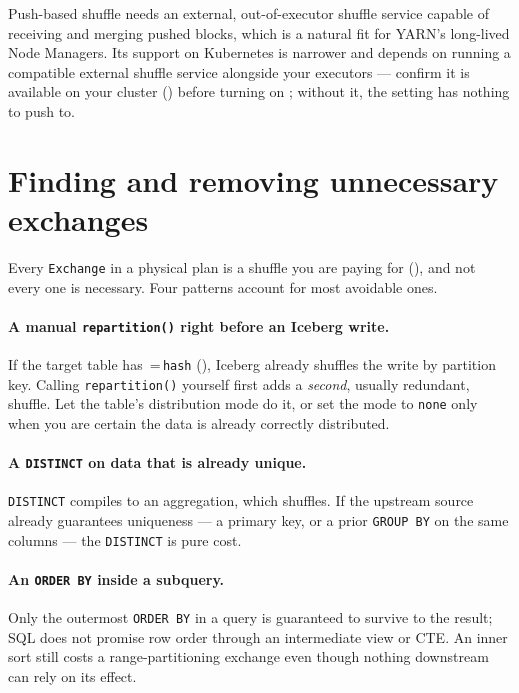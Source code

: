 \begin{note}
Push-based shuffle needs an external, out-of-executor shuffle service capable
of receiving and merging pushed blocks, which is a natural fit for YARN's
long-lived Node Managers. Its support on Kubernetes is narrower and depends on
running a compatible external shuffle service alongside your executors ---
confirm it is available on your cluster () before turning on
; without it, the setting has nothing to push
to.
\end{note}

\section{Finding and removing unnecessary exchanges}
\label{sec:shuffle-unnecessary}

Every \texttt{Exchange} in a physical plan is a shuffle you are paying for
(), and not every one is necessary. Four patterns account
for most avoidable ones.

\paragraph{A manual \texttt{repartition()} right before an Iceberg write.} If
the target table has \,=\,\texttt{hash}
(), Iceberg already shuffles the write by partition key.
Calling \texttt{repartition()} yourself first adds a \emph{second}, usually
redundant, shuffle. Let the table's distribution mode do it, or set the mode to
\texttt{none} only when you are certain the data is already correctly
distributed.

\paragraph{A \texttt{DISTINCT} on data that is already unique.} \texttt{DISTINCT}
compiles to an aggregation, which shuffles. If the upstream source already
guarantees uniqueness --- a primary key, or a prior \texttt{GROUP BY} on the same
columns --- the \texttt{DISTINCT} is pure cost.

\paragraph{An \texttt{ORDER BY} inside a subquery.} Only the outermost
\texttt{ORDER BY} in a query is guaranteed to survive to the result; SQL does
not promise row order through an intermediate view or CTE. An inner sort still
costs a range-partitioning exchange even though nothing downstream can rely on
its effect.

